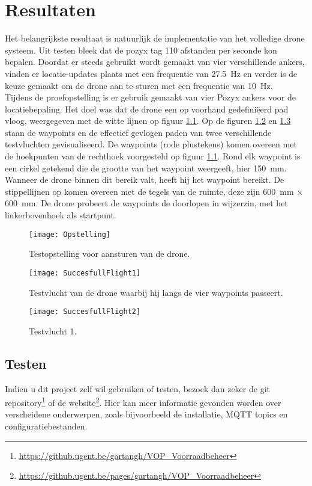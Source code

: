 \chapter{Resultaten}
Het belangrijkste resultaat is natuurlijk de implementatie van het volledige drone systeem. Uit testen bleek dat de pozyx tag 110 afstanden per seconde kon bepalen. Doordat er steeds gebruikt wordt gemaakt van vier verschillende ankers, vinden er locatie-updates plaats met een frequentie van \SI{27.5}{\Hz} en verder is de keuze gemaakt om de drone aan te sturen met een frequentie van \SI{10}{\Hz}.\\

Tijdens de proefopstelling is er gebruik gemaakt van vier Pozyx ankers voor de locatiebepaling. Het doel was dat de drone een op voorhand gedefini\"eerd pad vloog, weergegeven met de witte lijnen op figuur \ref{fig:Opstelling}. Op de figuren \ref{fig:SuccesfullFlight1} en \ref{fig:SuccesfullFlight2} staan de waypoints en de effectief gevlogen paden van twee verschillende testvluchten gevisualiseerd.
De waypoints (rode plustekens) komen overeen met de hoekpunten van de rechthoek voorgesteld op figuur \ref{fig:Opstelling}.
Rond elk waypoint is een cirkel getekend die de grootte van het waypoint weergeeft, hier \SI{150}{\mm}.
Wanneer de drone binnen dit bereik valt, heeft hij het waypoint bereikt.
De stippellijnen op komen overeen met de tegels van de ruimte, deze zijn \SI{600}{\mm} $\times$ \SI{600}{\mm}.
De drone probeert de waypoints de doorlopen in wijzerzin, met het linkerbovenhoek als startpunt. 
\begin{figure}[p]
	\centering
	\texttt{[image: Opstelling]}
	\caption[Opstelling testvluchten]{Testopstelling voor aansturen van de drone.}
	\label{fig:Opstelling}
\end{figure}

\begin{figure}[p]	
	\centering
	\texttt{[image: SuccesfullFlight1]}
	\caption[Testvlucht 1]{Testvlucht van de drone waarbij hij langs de vier waypoints passeert.}
	\label{fig:SuccesfullFlight1}
\end{figure}
	
\begin{figure}[p]
	\centering
	\texttt{[image: SuccesfullFlight2]}
	\caption[Testvlucht 2]{Testvlucht 1.}
	\label{fig:SuccesfullFlight2}
\end{figure}

\section{Testen} \label{sec:test}
Indien u dit project zelf wil gebruiken of testen, bezoek dan zeker de git repository\footnote{\url{https://github.ugent.be/gartangh/VOP_Voorraadbeheer}} of de website\footnote{\url{https://github.ugent.be/pages/gartangh/VOP_Voorraadbeheer}}.
Hier kan meer informatie gevonden worden over verscheidene onderwerpen, zoals bijvoorbeeld de installatie, MQTT topics en configuratiebestanden.

